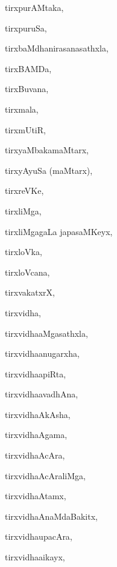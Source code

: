 \begin{multicols}{3}
{\noindent
{tirxpurAMtaka}, \pageref{tirxpurAMtaka}

\noindent
{tirxpuruSa}, \pageref{tirxpuruSa}

\noindent
{tirxbaMdhanirasanasathxla}, \pageref{tirxbaMdhanirasanasathxla}

\noindent
{tirxBAMDa}, \pageref{tirxBAMDa}

\noindent
{tirxBuvana}, \pageref{tirxBuvana}

\noindent
{tirxmala}, \pageref{tirxmala}

\noindent
{tirxmUtiR}, \pageref{tirxmUtiR}

\noindent
{tirxyaMbakamaMtarx}, \pageref{tirxyaMbakamaMtarx}

\noindent
{tirxyAyuSa (maMtarx)}, \pageref{tirxyAyuSa maMtarx}

\noindent
{tirxreVKe}, \pageref{tirxreVKe}

\noindent
{tirxliMga}, \pageref{tirxliMga}

\noindent
{tirxliMgagaLa japasaMKeyx}, \pageref{tirxliMgagaLa japasaMKeyx}

\noindent
{tirxloVka}, \pageref{tirxloVka}

\noindent
{tirxloVcana}, \pageref{tirxloVcana}

\noindent
{tirxvakatxrX}, \pageref{tirxvakatxrX}

\noindent
{tirxvidha}, \pageref{tirxvidha}

\noindent
{tirxvi{dha}aMgasathxla}, \pageref{tirxvidhaaMgasathxla}

\noindent
{tirxvi{dha}anugarxha}, \pageref{tirxvidhaanugarxha}

\noindent
{tirxvi{dha}apiRta}, \pageref{tirxvidhaapiRta}

\noindent
{tirxvi{dha}avadhAna}, \pageref{tirxvidhaavadhAna}

\noindent
{tirxvi{dha}AkAsha}, \pageref{tirxvidhaAkAsha}

\noindent
{tirxvi{dha}Agama}, \pageref{tirxvidhaAgama}

\noindent
{tirxvi{dha}AcAra}, \pageref{tirxvidhaAcAra}

\noindent
{tirxvi{dha}AcAraliMga}, \pageref{tirxvidhaAcAraliMga}

\noindent
{tirxvi{dha}Atamx}, \pageref{tirxvidhaAtamx}

\noindent
{tirxvi{dha}AnaMdaBakitx}, \pageref{tirxvidhaAnaMdaBakitx}

\noindent
{tirxvi{dha}upacAra}, \pageref{tirxvidhaupacAra}

\noindent
{tirxvi{dha}aikayx}, \pageref{tirxvidhaaikayx}

}
\end{multicols}
